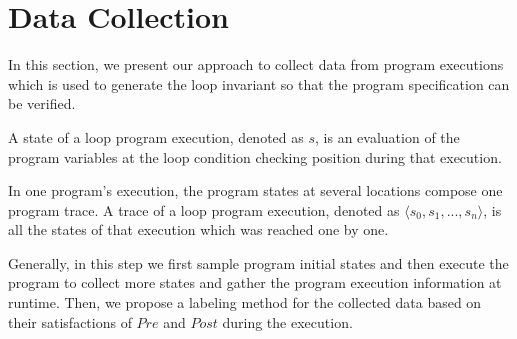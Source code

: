 
\section{Data Collection} %
\label{sec:sampling}

In this section, we present our approach to collect data from program executions 
which is used to generate the loop invariant so that the program specification can be verified.

\begin{definition}[State]
A state of a loop program execution, denoted as $s$, is an evaluation of the program variables at the loop condition checking position during that execution. 
\end{definition}
\begin{definition}[Trace]
In one program's execution, the program states at several locations compose one program trace.
A trace of a loop program execution, denoted as $\langle s_0, s_1, ..., s_n\rangle$, is all the states of that execution which was reached one by one. 
\end{definition}

Generally, in this step we first sample program initial states and 
then execute the program to collect more states and gather the program execution information at runtime.
Then, we propose a labeling method for the collected data
based on their satisfactions of $\mathit{Pre}$ and $\mathit{Post}$ during the execution. 

